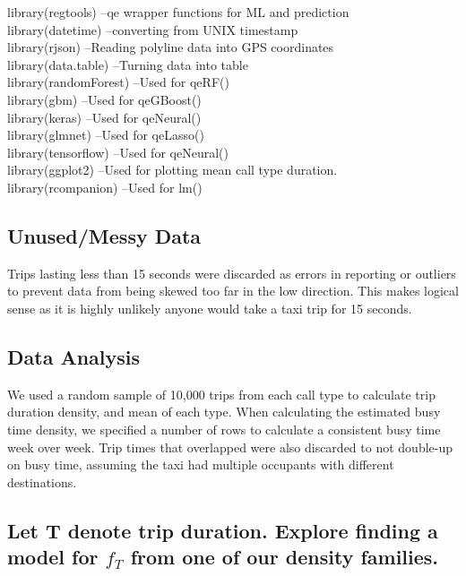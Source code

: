 \documentclass{article}
\numberwithin{equation}{section}
\begin{document}
library(regtools)    --qe wrapper functions for ML and prediction\\
library(datetime)    --converting from UNIX timestamp\\
library(rjson)    --Reading polyline data into GPS coordinates\\
library(data.table)  --Turning data into table\\
library(randomForest)    --Used for qeRF()\\
library(gbm)    --Used for qeGBoost()\\
library(keras)    --Used for qeNeural()\\
library(glmnet)    --Used for qeLasso()\\
library(tensorflow)    --Used for qeNeural()\\
library(ggplot2)    --Used for plotting mean call type duration.\\
library(rcompanion)    --Used for lm()\\

\subsection{Unused/Messy Data}
Trips lasting less than 15 seconds were discarded as errors in reporting or outliers to prevent data from being skewed too far in the low direction. This makes logical sense as it is highly unlikely anyone would take a taxi trip for 15 seconds.

\subsection{Data Analysis}
We used a random sample of 10,000 trips from each call type to calculate trip duration density, and mean of each type. When calculating the estimated busy time density, we specified a number of rows to calculate a consistent busy time week over week. Trip times that overlapped were also discarded to not double-up on busy time, assuming the taxi had multiple occupants with different destinations.

\subsection{Let T denote trip duration. Explore finding a model for $f_{T}$ from one of our density families.}

%
\end{document}
